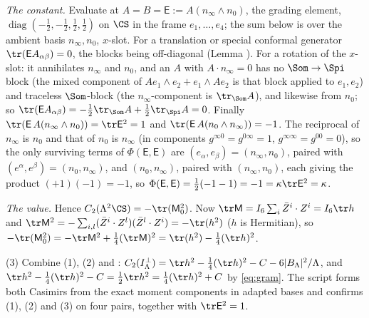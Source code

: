\emph{The constant.} Evaluate at $A = B = \mathsf{E} := A(n_{\infty}\wedge n_{0})$, the grading element, $\operatorname{diag}(-\tfrac12,-\tfrac12,\tfrac12,\tfrac12)$ on $\CS$ in the frame $e_{1}, \ldots, e_{4}$; the sum below is over the ambient basis $n_{\infty}, n_{0}$, $x$-slot. For a translation or special conformal generator $\tr(\mathsf{E}A_{\alpha\beta}) = 0$, the blocks being off-diagonal (Lemma ). For a rotation of the $x$-slot: it annihilates $n_{\infty}$ and $n_{0}$, and an $A$ with $A\cdot n_{\infty} = 0$ has no $\Som \to \Spi$ block (the mixed component of $Ae_{1}\wedge e_{2} + e_{1}\wedge Ae_{2}$ is that block applied to $e_{1}, e_{2}$) and traceless $\Som$-block (the $n_{\infty}$-component is $\tr_{\Som}A$), and likewise from $n_{0}$; so $\tr(\mathsf{E}A_{\alpha\beta}) = -\tfrac12\tr_{\Som}A + \tfrac12\tr_{\Spi}A = 0$. Finally $\tr(\mathsf{E}\,A(n_{\infty}\wedge n_{0})) = \tr \mathsf{E}^{2} = 1$ and $\tr(\mathsf{E}\,A(n_{0}\wedge n_{\infty})) = -1$. The reciprocal of $n_{\infty}$ is $n_{0}$ and that of $n_{0}$ is $n_{\infty}$ (in components $g^{\infty 0} = g^{0\infty} = 1$, $g^{\infty\infty} = g^{00} = 0$), so the only surviving terms of $\Phi(\mathsf{E},\mathsf{E})$ are $(e_{\alpha}, e_{\beta}) = (n_{\infty}, n_{0})$, paired with $(e^{\alpha}, e^{\beta}) = (n_{0}, n_{\infty})$, and $(n_{0}, n_{\infty})$, paired with $(n_{\infty}, n_{0})$, each giving the product $(+1)(-1) = -1$, so $\Phi(\mathsf{E},\mathsf{E}) = \tfrac12(-1-1) = -1 = \kappa\tr \mathsf{E}^{2} = \kappa$.

\emph{The value.} Hence $C_{2}(\Lambda^{2}\CS) = -\tr(\mathsf{M}_{0}^{2})$. Now $\tr\mathsf{M} = I_{6}\sum_{i}\bar{Z}^{i}\cdot Z^{i} = I_{6}\tr h$ and $\tr\mathsf{M}^{2} = -\sum_{i,l}(\bar{Z}^{i}\cdot Z^{l})(\bar{Z}^{l}\cdot Z^{i}) = -\tr(h^{2})$ ($h$ is Hermitian), so $-\tr(\mathsf{M}_{0}^{2}) = -\tr\mathsf{M}^{2} + \tfrac14(\tr\mathsf{M})^{2} = \tr(h^{2}) - \tfrac14(\tr h)^{2}$.

(3) Combine (1), (2) and : $C_{2}(I_{\Lambda}^{\perp}) = \tr h^{2} - \tfrac14(\tr h)^{2} - C - 6|B_{\Lambda}|^{2}/\Lambda$, and $\tr h^{2} - \tfrac14(\tr h)^{2} - C = \tfrac12\tr h^{2} = \tfrac14(\tr h)^{2} + C$ by \eqref{eq:gram}. The script forms both Casimirs from the exact moment components in adapted bases and confirms (1), (2) and (3) on four pairs, together with $\tr\mathsf{E}^{2} = 1$.
